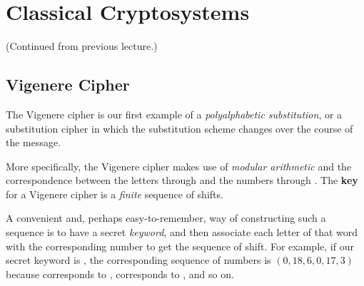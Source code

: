 \documentclass[letterpaper]{article}
\begin{document}
\section{Classical Cryptosystems}
(Continued from previous lecture.)

\subsection{Vigenere Cipher}
The Vigenere cipher is our first example of a \emph{polyalphabetic substitution}, or a substitution cipher in which the substitution scheme changes over the course of the message.

\bigskip 

More specifically, the Vigenere cipher makes use of \emph{modular arithmetic} and the correspondence between the letters  through  and the numbers  through . The \textbf{key} for a Vigenere cipher is a \emph{finite} sequence of shifts. 

\bigskip 

A convenient and, perhaps easy-to-remember, way of constructing such a sequence is to have a secret \emph{keyword}, and then associate each letter of that word with the corresponding number to get the sequence of shift. For example, if our secret keyword is , the corresponding sequence of numbers is $(0, 18, 6, 0, 17, 3)$ because  corresponds to ,  corresponds to , and so on.
\end{document}
